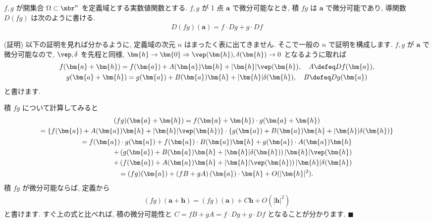 \documentclass[openany, a4paper, oneside]{jsbook}
\begin{document}
\begin{thm}
 $f,g$ が開集合
 $\Omega \subset \mbr^n$ を定義域とする実数値関数とする.
 $f,g$ が 1 点 $\bm{a}$ で微分可能なとき, 積 $fg$ は $\bm{a}$ で微分可能であり,
 導関数 $D (fg)$ は次のように書ける.
 \begin{gather}
 D (fg) ( \bm{a} ) = f \cdot Dg + g \cdot Df
 \end{gather}
\end{thm}
(証明)
以下の証明を見れば分かるように, 定義域の次元 $n$ はまったく表に出てきません.
そこで一般の $n$ で証明を構成します.
 $f,g$ が $\bm{a}$ で微分可能なので,  $\vep,\delta$ を先程と同様,
 $\bm{h} \to \bm{0} \Rightarrow \vep ( \bm{h} ) , \delta ( \bm{h} ) \to 0$ となるように取れば
\begin{gather}
f ( \bm{a} + \bm{h}  )
=
f ( \bm{a} ) + A ( \bm{a} ) \bm{h} + | \bm{h} | \vep ( \bm{h} ) ,  \quad A \defeq Df ( \bm{a} ) , \\
g ( \bm{a} + \bm{h}  )
=
g ( \bm{a} ) + B ( \bm{a} ) \bm{h} + | \bm{h} | \delta ( \bm{h} ),  \quad B \defeq Dg ( \bm{a} )
\end{gather}
と書けます.

積 $fg$ について計算してみると
\begin{gather}
(fg) ( \bm{a} + \bm{h} )
=
f ( \bm{a} + \bm{h} ) \cdot g ( \bm{a} + \bm{h} ) \\
=
\left \{ f ( \bm{a} ) + A ( \bm{a} ) \bm{h} + | \bm{h} | \vep ( \bm{h} ) \right \}
\cdot \left \{ g ( \bm{a} ) + B ( \bm{a} ) \bm{h} + | \bm{h} | \delta ( \bm{h} ) \right \} \\
\begin{split}
=
f ( \bm{a} ) \cdot g ( \bm{a} )
+f ( \bm{a} ) \cdot B ( \bm{a} ) \bm{h}
+g ( \bm{a} ) \cdot A ( \bm{a} ) \bm{h} \\
+\left ( g ( \bm{a} ) + B ( \bm{a} ) \bm{h} + | \bm{h} | \delta ( \bm{h} ) \right) | \bm{h} | \vep ( \bm{h} ) \\
+\left ( f ( \bm{a} ) + A ( \bm{a} ) \bm{h} + | \bm{h} | \vep ( \bm{h} ) \right) | \bm{h} | \delta ( \bm{h} )
\end{split} \\
=
(fg) ( \bm{a} )
+\left (
fB + gA
\right )
(\bm{a}) \cdot \bm{h}
+O ( | \bm{h} |^2 ) .
\end{gather}
積 $fg$ が微分可能ならば, 定義から
\begin{gather}
(fg) ( \bm{a} + \bm{h} )
=
(fg) ( \bm{a} ) + C \bm{h} + O ( | \bm{h} |^2 )
\end{gather}
と書けます.
すぐ上の式と比べれば, 積の微分可能性と $C = fB + gA = f \cdot Dg + g \cdot Df$ となることが分かります.  $\blacksquare$
\end{document}
